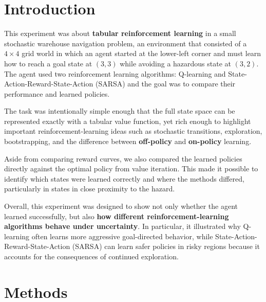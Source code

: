 \documentclass[10pt,twocolumn]{article}
\begin{document}
\section{Introduction} 
\label{sec:introduction}

This experiment was about \textbf{tabular reinforcement learning} in a small stochastic warehouse navigation problem, an environment that consisted of a $4 \times 4$ grid world in which an agent started at the lower-left corner and must learn how to reach a goal state at $(3, 3)$ while avoiding a hazardous state at $(3, 2)$. The agent used two reinforcement learning algorithms: Q-learning and State-Action-Reward-State-Action (SARSA) and the goal was to compare their performance and learned policies.

The task was intentionally simple enough that the full state space can be represented exactly with a tabular value function, yet rich enough to highlight important reinforcement-learning ideas such as stochastic transitions, exploration, bootstrapping, and the difference between \textbf{off-policy} and \textbf{on-policy} learning.

Aside from comparing reward curves, we also compared the learned policies directly against the optimal policy from value iteration. This made it possible to identify which states were learned correctly and where the methods differed, particularly in states in close proximity to the hazard.

Overall, this experiment was designed to show not only whether the agent learned successfully, but also \textbf{how different reinforcement-learning algorithms behave under uncertainty}. In particular, it illustrated why Q-learning often learns more aggressive goal-directed behavior, while State-Action-Reward-State-Action (SARSA) can learn safer policies in risky regions because it accounts for the consequences of continued exploration.

\section{Methods}
\end{document}
